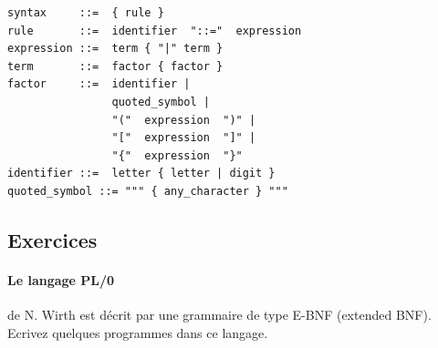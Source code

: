 \begin{lstlisting}[frame=single]
syntax     ::=  { rule }
rule       ::=  identifier  "::="  expression
expression ::=  term { "|" term }
term       ::=  factor { factor }
factor     ::=  identifier |
                quoted_symbol |
                "("  expression  ")" |
                "["  expression  "]" |
                "{"  expression  "}"
identifier ::=  letter { letter | digit }
quoted_symbol ::= """ { any_character } """
\end{lstlisting}

\subsection{Exercices}
\paragraph{Le langage PL/0} de N. Wirth est décrit par une grammaire
de type E-BNF (extended BNF). Ecrivez quelques programmes dans ce langage.
